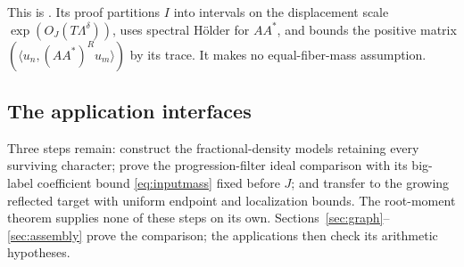 This is \cite[Corollary 3.11]{weightedgraphs}. Its proof partitions
\(I\) into intervals on the displacement scale
\(\exp(O_J(T\Lambda^\delta))\), uses spectral H\"older for
\(AA^*\), and bounds the positive matrix
\((\langle u_n,(AA^*)^Ru_m\rangle)\) by its trace.
It makes no equal-fiber-mass assumption.

\subsection{The application interfaces}

Three steps remain: construct the fractional-density models retaining
every surviving character; prove the progression-filter ideal comparison
with its big-label coefficient bound \eqref{eq:inputmass} fixed before
\(J\); and transfer to the growing reflected target with uniform endpoint
and localization bounds. The root-moment theorem supplies none of these
steps on its own. Sections~\ref{sec:graph}--\ref{sec:assembly} prove the
comparison; the applications then check its arithmetic hypotheses.
